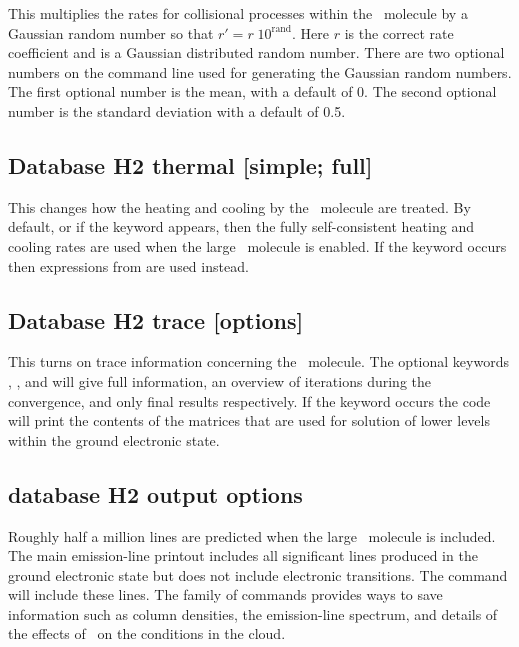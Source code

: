 This multiplies the rates for collisional processes within the \htwo\ molecule
by a Gaussian random number so that $r' = r\;10^{{\mathrm{rand}}} $.
Here $r$
is the correct rate coefficient and  is a Gaussian
distributed random number.  There are two optional numbers on the command
line used for generating the Gaussian random numbers.
The first optional number is the mean, with a default of 0.  The second
optional number is the standard deviation with a default of 0.5.

\subsection{Database H2 thermal [simple; full]}

This changes how the heating and cooling by the \htwo\ molecule
are treated.
By default, or if the keyword  appears,
then the fully self-consistent
heating and cooling rates are used when the large \htwo\ molecule
is enabled.
If the keyword  occurs then expressions
from \citet{Tielens1985a} are used instead.

\subsection{Database H2 trace [options]}

This turns on trace information concerning the \htwo\ molecule.
The optional
keywords , ,
and  will give full information, an overview
of iterations during the convergence, and only final results respectively.
If the keyword  occurs the code will print
the contents of the matrices
that are used for solution of lower levels within the ground electronic
state.

\subsection{database H2 output options}

Roughly half a million lines are predicted when the large
\htwo\ molecule is included.
The main emission-line printout includes all significant lines
produced in the ground electronic state but does not include electronic
transitions.
The  command
will include these lines.
The family of  commands
provides ways to save information such as column densities,
the emission-line spectrum, and details of the effects of \htwo\ on the
conditions in the cloud.

